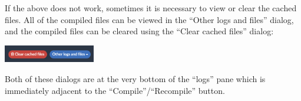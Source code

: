 If the above does not work, sometimes it is necessary to view or clear the cached files.
All of the compiled files can be viewed in the ``Other logs and files'' dialog, and the compiled files can be cleared using the ``Clear cached files'' dialog:
\begin{center}
    \includegraphics[width=0.3\textwidth,keepaspectratio]{tutorial/CachedFiles.png}
\end{center}
Both of these dialogs are at the very bottom of the ``logs'' pane which is immediately adjacent to the ``Compile''/``Recompile'' button.